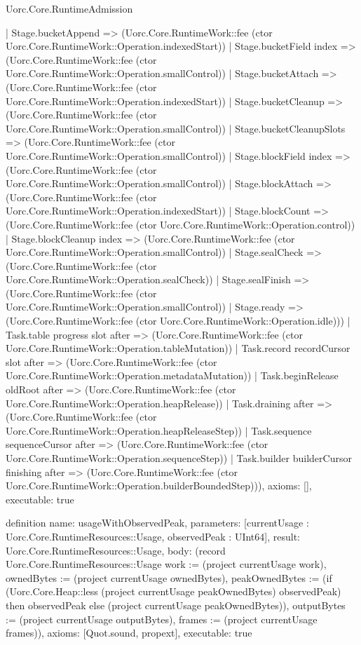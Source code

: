 \begin{lexlean}{Uorc.Core.RuntimeAdmission}
\begin{semanticmodule}
{      | Stage.bucketAppend => (Uorc.Core.RuntimeWork::fee (ctor Uorc.Core.RuntimeWork::Operation.indexedStart))
      | Stage.bucketField index => (Uorc.Core.RuntimeWork::fee (ctor Uorc.Core.RuntimeWork::Operation.smallControl))
      | Stage.bucketAttach => (Uorc.Core.RuntimeWork::fee (ctor Uorc.Core.RuntimeWork::Operation.indexedStart))
      | Stage.bucketCleanup => (Uorc.Core.RuntimeWork::fee (ctor Uorc.Core.RuntimeWork::Operation.smallControl))
      | Stage.bucketCleanupSlots => (Uorc.Core.RuntimeWork::fee (ctor Uorc.Core.RuntimeWork::Operation.smallControl))
      | Stage.blockField index => (Uorc.Core.RuntimeWork::fee (ctor Uorc.Core.RuntimeWork::Operation.smallControl))
      | Stage.blockAttach => (Uorc.Core.RuntimeWork::fee (ctor Uorc.Core.RuntimeWork::Operation.indexedStart))
      | Stage.blockCount => (Uorc.Core.RuntimeWork::fee (ctor Uorc.Core.RuntimeWork::Operation.control))
      | Stage.blockCleanup index => (Uorc.Core.RuntimeWork::fee (ctor Uorc.Core.RuntimeWork::Operation.smallControl))
      | Stage.sealCheck => (Uorc.Core.RuntimeWork::fee (ctor Uorc.Core.RuntimeWork::Operation.sealCheck))
      | Stage.sealFinish => (Uorc.Core.RuntimeWork::fee (ctor Uorc.Core.RuntimeWork::Operation.smallControl))
      | Stage.ready => (Uorc.Core.RuntimeWork::fee (ctor Uorc.Core.RuntimeWork::Operation.idle)))
    | Task.table progress slot after => (Uorc.Core.RuntimeWork::fee (ctor Uorc.Core.RuntimeWork::Operation.tableMutation))
    | Task.record recordCursor slot after => (Uorc.Core.RuntimeWork::fee (ctor Uorc.Core.RuntimeWork::Operation.metadataMutation))
    | Task.beginRelease oldRoot after => (Uorc.Core.RuntimeWork::fee (ctor Uorc.Core.RuntimeWork::Operation.heapRelease))
    | Task.draining after => (Uorc.Core.RuntimeWork::fee (ctor Uorc.Core.RuntimeWork::Operation.heapReleaseStep))
    | Task.sequence sequenceCursor after => (Uorc.Core.RuntimeWork::fee (ctor Uorc.Core.RuntimeWork::Operation.sequenceStep))
    | Task.builder builderCursor finishing after => (Uorc.Core.RuntimeWork::fee (ctor Uorc.Core.RuntimeWork::Operation.builderBoundedStep))),
  axioms: [],
  executable: true
}

definition{
  name: usageWithObservedPeak,
  parameters: [currentUsage : Uorc.Core.RuntimeResources::Usage, observedPeak : UInt64],
  result: Uorc.Core.RuntimeResources::Usage,
  body: (record Uorc.Core.RuntimeResources::Usage {work := (project currentUsage work), ownedBytes := (project currentUsage ownedBytes), peakOwnedBytes := (if (Uorc.Core.Heap::less (project currentUsage peakOwnedBytes) observedPeak) then observedPeak else (project currentUsage peakOwnedBytes)), outputBytes := (project currentUsage outputBytes), frames := (project currentUsage frames)}),
  axioms: [Quot.sound, propext],
  executable: true
}


\end{semanticmodule}
\end{lexlean}
